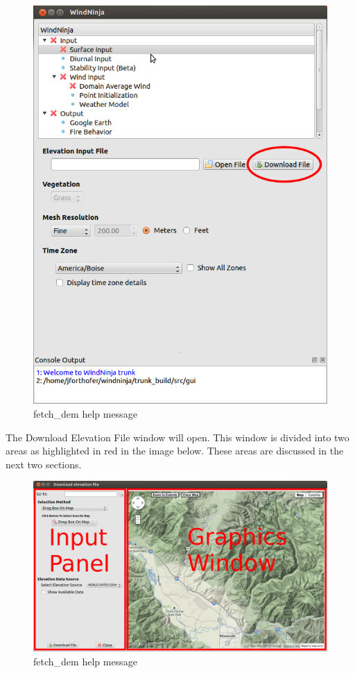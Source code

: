\documentclass[12pt,oneside,final]{article}
\begin{document}
\begin{figure}[ht!]
    \centering
    \includegraphics[width=5in]{images/download_dem_1.png}
    \caption{fetch\_dem help message}
\end{figure}

The Download Elevation File window will open.  This window is divided into two
areas as highlighted in red in the image below.  These areas are discussed in
the next two sections.

\begin{figure}[ht!]
    \centering
    \includegraphics[width=7in]{images/download_dem_2.png}
    \caption{fetch\_dem help message}
\end{figure}
\end{document}
